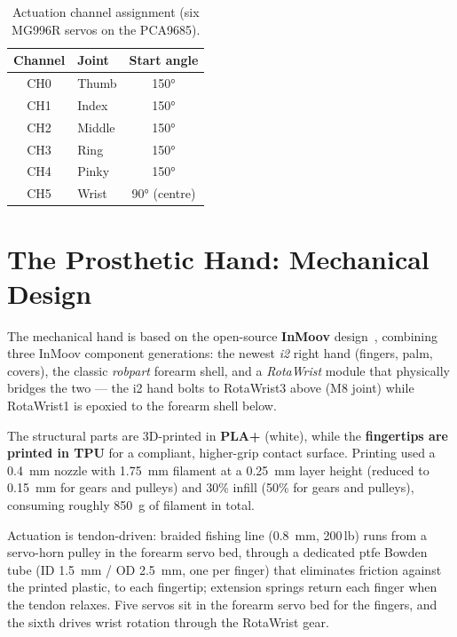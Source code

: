 \begin{table}[htbp]
\centering
\caption{Actuation channel assignment (six MG996R servos on the PCA9685).}
\label{tab:hw_servos}
\begin{tabular}{@{}clc@{}}
\toprule
\textbf{Channel} & \textbf{Joint} & \textbf{Start angle} \\
\midrule
CH0 & Thumb  & \ang{150} \\
CH1 & Index  & \ang{150} \\
CH2 & Middle & \ang{150} \\
CH3 & Ring   & \ang{150} \\
CH4 & Pinky  & \ang{150} \\
CH5 & Wrist  & \ang{90} (centre) \\
\bottomrule
\end{tabular}
\end{table}

\section{The Prosthetic Hand: Mechanical Design}
\label{sec:hw_hand}

The mechanical hand is based on the open-source \textbf{InMoov}
design~\cite{langevin2026inmoov}, combining three InMoov component generations:
the newest \emph{i2} right hand (fingers, palm, covers), the classic
\emph{robpart} forearm shell, and a \emph{RotaWrist} module that
physically bridges the two --- the i2 hand bolts to RotaWrist3 above
(M8 joint) while RotaWrist1 is epoxied to the forearm shell below.

The structural parts are 3D-printed in \textbf{PLA+} (white), while
the \textbf{fingertips are printed in TPU} for a compliant, higher-grip
contact surface. Printing used a \SI{0.4}{\milli\meter} nozzle with
\SI{1.75}{\milli\meter} filament at a \SI{0.25}{\milli\meter} layer
height (reduced to \SI{0.15}{\milli\meter} for gears and pulleys) and
30\% infill (50\% for gears and pulleys), consuming roughly
\SI{850}{\gram} of filament in total.

Actuation is tendon-driven: braided fishing line
(\SI{0.8}{\milli\meter}, 200\,lb) runs from a servo-horn pulley in the
forearm servo bed, through a dedicated \acrshort{ptfe} Bowden tube
(ID \SI{1.5}{\milli\meter} / OD \SI{2.5}{\milli\meter}, one per finger)
that eliminates friction against the printed plastic, to each
fingertip; extension springs return each finger when the tendon
relaxes. Five servos sit in the forearm servo bed for the fingers, and
the sixth drives wrist rotation through the RotaWrist gear.

